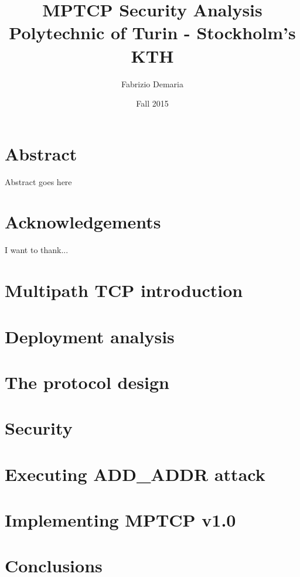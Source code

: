 \documentclass[12pt]{report}
\title{
	{MPTCP Security Analysis}\\
	{\large Polytechnic of Turin - Stockholm's KTH}\\
}
\author{Fabrizio Demaria}
\date{Fall 2015}
\begin{document}
\maketitle


\chapter*{Abstract}
Abstract goes here

\chapter*{Acknowledgements}
I want to thank...

\tableofcontents

\chapter{Multipath TCP introduction}


\chapter{Deployment analysis}


\chapter{The protocol design}


\chapter{Security}



\chapter{Executing ADD\_ADDR attack}


\chapter{Implementing MPTCP v1.0}


\chapter{Conclusions}

\end{document}
